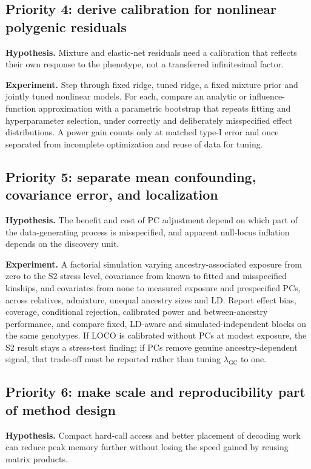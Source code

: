\documentclass[11pt]{article}
\newcommand{\lgc}{\lambda_{\mathrm{GC}}}
\begin{document}
\subsection{Priority 4: derive calibration for nonlinear polygenic residuals}

\textbf{Hypothesis.} Mixture and elastic-net residuals need a calibration
that reflects their own response to the phenotype, not a transferred
infinitesimal factor.

\textbf{Experiment.} Step through fixed ridge, tuned ridge, a fixed
mixture prior and jointly tuned nonlinear models. For each, compare an
analytic or influence-function approximation with a parametric bootstrap
that repeats fitting and hyperparameter selection, under correctly and
deliberately misspecified effect distributions. A power gain counts only
at matched type-I error and once separated from incomplete optimization
and reuse of data for tuning.

\subsection{Priority 5: separate mean confounding, covariance error, and localization}

\textbf{Hypothesis.} The benefit and cost of PC adjustment depend on which
part of the data-generating process is misspecified, and apparent
null-locus inflation depends on the discovery unit.

\textbf{Experiment.} A factorial simulation varying ancestry-associated
exposure from zero to the S2 stress level, covariance from known to
fitted and misspecified kinships, and covariates from none to measured
exposure and prespecified PCs, across relatives, admixture, unequal
ancestry sizes and LD. Report effect bias, coverage, conditional
rejection, calibrated power and between-ancestry performance, and compare
fixed, LD-aware and simulated-independent blocks on the same genotypes.
If LOCO is calibrated without PCs at modest exposure, the S2 result stays
a stress-test finding; if PCs remove genuine ancestry-dependent signal,
that trade-off must be reported rather than tuning $\lgc$ to one.

\subsection{Priority 6: make scale and reproducibility part of method design}

\textbf{Hypothesis.} Compact hard-call access and better placement of
decoding work can reduce peak memory further without losing the
speed gained by reusing matrix products.
\end{document}
